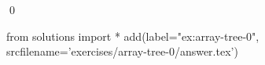 
\begin{ex} 
  \label{ex:array-tree-0}
  
  \qed
\end{ex} 
\begin{python0}
from solutions import *
add(label="ex:array-tree-0",
    srcfilename='exercises/array-tree-0/answer.tex') 
\end{python0}
